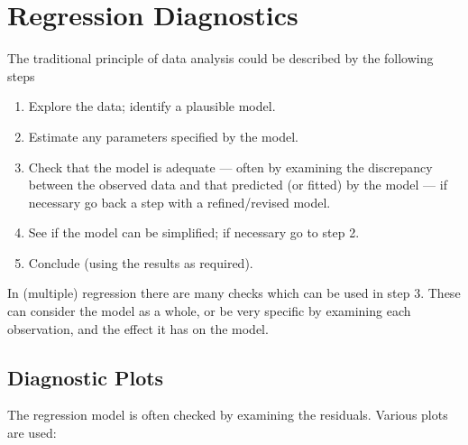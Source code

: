 \documentclass[
  a4paper,
]{article}
\providecommand{\tightlist}{%
  \setlength{\itemsep}{0pt}\setlength{\parskip}{0pt}}
\theoremstyle{definition}
\theoremstyle{definition}
\theoremstyle{definition}
\theoremstyle{definition}
\theoremstyle{remark}
\begin{document}
\clearpage

\hypertarget{S08-diagnostics}{%
\section{Regression Diagnostics}\label{S08-diagnostics}}

The traditional principle of data analysis could be described by the following
steps

\begin{enumerate}
\def\labelenumi{\arabic{enumi}.}
\tightlist
\item
  Explore the data; identify a plausible model.
\item
  Estimate any parameters specified by the model.
\item
  Check that the model is adequate --- often by examining the discrepancy
  between the observed data and that predicted (or fitted) by the model --- if
  necessary go back a step with a refined/revised model.
\item
  See if the model can be simplified; if necessary go to step 2.
\item
  Conclude (using the results as required).
\end{enumerate}

In (multiple) regression there are many checks which can be used in step 3.
These can consider the model as a whole, or be very specific by examining each
observation, and the effect it has on the model.

\hypertarget{plots}{%
\subsection{Diagnostic Plots}\label{plots}}

The regression model is often checked by examining the residuals. Various plots
are used:
\end{document}
